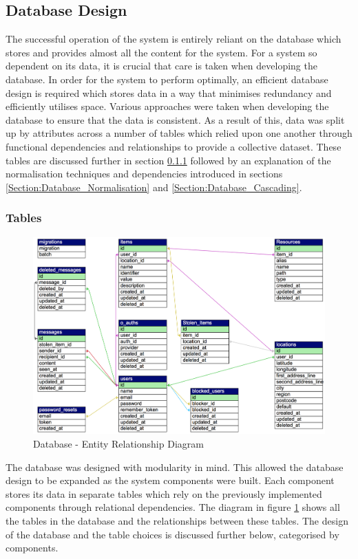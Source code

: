 \subsection{Database Design}
The successful operation of the system is entirely reliant on the database which stores and provides almost all the content for the system. For a system so dependent on its data, it is crucial that care is taken when developing the database. In order for the system to perform optimally, an efficient database design is required which stores data in a way that minimises redundancy and efficiently utilises space. Various approaches were taken when developing the database to ensure that the data is consistent. As a result of this, data was split up by attributes across a number of tables which relied upon one another through functional dependencies and relationships to provide a collective dataset. These tables are discussed further in section \ref{Section:Database_Tables} followed by an explanation of the normalisation techniques and dependencies introduced in sections \ref{Section:Database_Normalisation} and \ref{Section:Database_Cascading}.

\subsubsection{Tables} \label{Section:Database_Tables}

\begin{figure}[H]
	\centering
	\includegraphics[width=1.0\textwidth]{images/Database/ERD_Plain}
	\caption{Database - Entity Relationship Diagram} \label{fig:ERD}
\end{figure}

The database was designed with modularity in mind. This allowed the database design to be expanded as the system components were built. Each component stores its data in separate tables which rely on the previously implemented components through relational dependencies. The diagram in figure \ref{fig:ERD} shows all the tables in the database and the relationships between these tables. The design of the database and the table choices is discussed further below, categorised by components.


